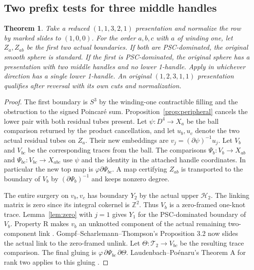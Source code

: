 \documentclass[11pt,letterpaper]{article}
\numberwithin{equation}{section}
\newtheorem{theorem}{Theorem}[section]
\theoremstyle{remark}
\newcommand{\HB}[1]{\mathcal H_{#1}}
\newcommand{\TB}[1]{\mathcal T_{#1}}
\begin{document}
\subsection{Two prefix tests for three middle handles}
\begin{theorem}\label{thm:three}
Take a reduced \((1,1,3,2,1)\) presentation and normalize
the row by marked slides to \((1,0,0)\). For the order
\(a,b,c\) with \(a\) of winding one, let \(Z_a,Z_{ab}\)
be the first two actual boundaries. If both are
PSC-dominated, the original smooth sphere is standard.
If the first is PSC-dominated, the original sphere has a
presentation with two middle handles and no lower
1-handle. Apply in whichever direction has a single lower
1-handle. An original \((1,2,3,1,1)\) presentation qualifies
after reversal with its own cuts and normalization.
\end{theorem}
\begin{proof}
The first boundary is \(S^3\) by the winding-one
contractible filling and the obstruction to the signed
Poincar\'e sum. Proposition~\ref{prop:peripheral} cancels
the lower pair with both residual tubes present.
Let \(\psi:D^4\to X_a\) be the ball comparison returned
by the product cancellation, and let \(u_b,u_c\) denote
the two actual residual tubes on \(Z_a\). Their new
embeddings are \(v_j=(\partial\psi)^{-1}u_j\).
Let \(V_b\) and \(V_{bc}\) be the corresponding traces
from the ball. The comparisons
\(\Psi_b:V_b\to X_{ab}\) and \(\Psi_{bc}:V_{bc}\to X_{abc}\)
use \(\psi\) and the identity in the attached handle
coordinates. In particular the new top map is
\(\varphi\partial\Psi_{bc}\).
A map certifying \(Z_{ab}\) is transported to the
boundary of \(V_b\) by \((\partial\Psi_b)^{-1}\) and
keeps nonzero degree.

The entire surgery on \(v_b,v_c\) has boundary \(Y_2\)
by the actual upper \(\HB{2}\). The linking matrix is
zero since its integral cokernel is \(\mathbb Z^2\).
Thus \(V_b\) is a zero-framed one-knot trace.
Lemma~\ref{lem:zero} with \(j=1\) gives \(Y_1\)
for the PSC-dominated boundary of \(V_b\). Property R
makes \(v_b\) an unknotted component of the actual
remaining two-component link
\cite[Corollary 8.3]{Gabai1987FoliationsIII}.
Gompf--Scharlemann--Thompson's Proposition 3.2
now slides the actual link to the zero-framed unlink.
Let \(\Theta:\TB{2}\to V_{bc}\) be the resulting trace
comparison. The final gluing is
\(\varphi\,\partial\Psi_{bc}\,\partial\Theta\).
Laudenbach--Po\'enaru's Theorem A for rank two
applies to this gluing
\cite[Proposition 3.2]{GompfScharlemannThompson2010}
\cite[Theorem A]{LaudenbachPoenaru1972Handlebodies}.
\end{proof}
\end{document}
